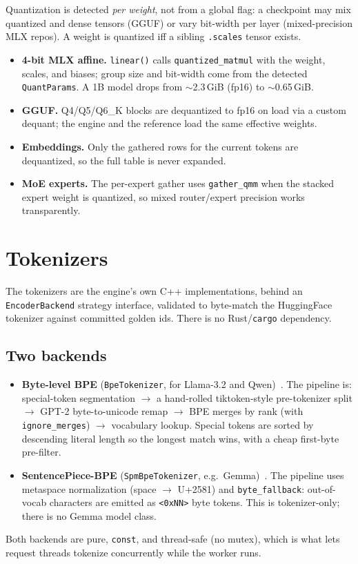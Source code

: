 \documentclass[11pt,a4paper]{report}
\newcommand{\code}[1]{\texttt{#1}}
\begin{document}
Quantization is detected \emph{per weight}, not from a global flag: a checkpoint may
mix quantized and dense tensors (GGUF) or vary bit-width per layer (mixed-precision
MLX repos). A weight is quantized iff a sibling \code{.scales} tensor exists.

\begin{itemize}[nosep]
  \item \textbf{4-bit MLX affine.} \code{linear()} calls \code{quantized\_matmul}
        with the weight, scales, and biases; group size and bit-width come from the
        detected \code{QuantParams}. A 1B model drops from $\sim$2.3\,GiB (fp16) to
        $\sim$0.65\,GiB.
  \item \textbf{GGUF.} Q4/Q5/Q6\_K blocks are dequantized to fp16 on load via a
        custom dequant; the engine and the reference load the same effective
        weights.
  \item \textbf{Embeddings.} Only the gathered rows for the current tokens are
        dequantized, so the full table is never expanded.
  \item \textbf{MoE experts.} The per-expert gather uses \code{gather\_qmm} when the
        stacked expert weight is quantized, so mixed router/expert precision works
        transparently.
\end{itemize}

\chapter{Tokenizers}
\label{ch:tok}

The tokenizers are the engine's own C++ implementations, behind an
\code{EncoderBackend} strategy interface, validated to byte-match the HuggingFace
tokenizer against committed golden ids. There is no Rust/\code{cargo} dependency.

\section{Two backends}
\begin{itemize}[nosep]
  \item \textbf{Byte-level BPE} (\code{BpeTokenizer}, for Llama-3.2 and
        Qwen)~\citep{sennrich2016bpe,radford2019gpt2}. The pipeline is:
        special-token segmentation $\to$ a hand-rolled tiktoken-style
        pre-tokenizer split $\to$ GPT-2 byte-to-unicode remap $\to$ BPE merges by
        rank (with \code{ignore\_merges}) $\to$ vocabulary lookup. Special tokens
        are sorted by descending literal length so the longest match wins, with a
        cheap first-byte pre-filter.
  \item \textbf{SentencePiece-BPE} (\code{SpmBpeTokenizer}, e.g.\
        Gemma)~\citep{kudo2018sentencepiece}. The pipeline uses metaspace
        normalization (space $\to$ U+2581) and \code{byte\_fallback}: out-of-vocab
        characters are emitted as \code{<0xNN>} byte tokens. This is tokenizer-only;
        there is no Gemma model class.
\end{itemize}
Both backends are pure, \code{const}, and thread-safe (no mutex), which is what lets
request threads tokenize concurrently while the worker runs.
\end{document}
